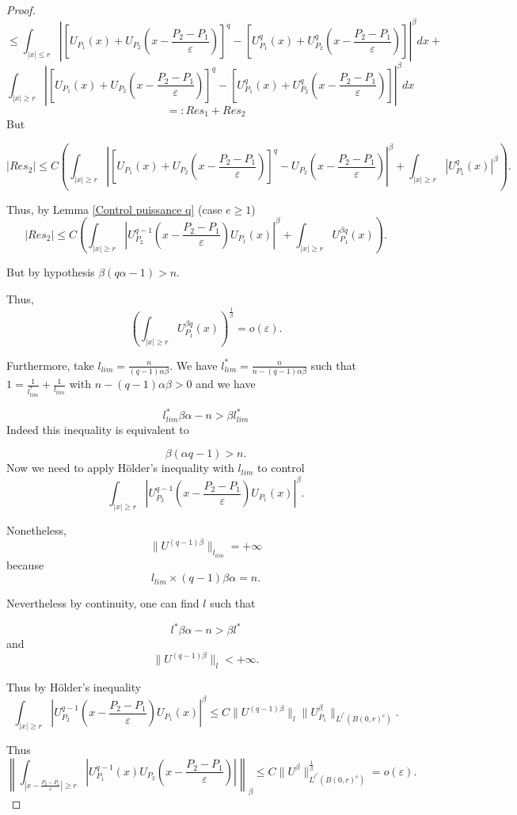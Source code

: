 \documentclass[12pt]{amsart}
\theoremstyle{plain}
\theoremstyle{definition}
\theoremstyle{remark}
\renewcommand{\epsilon}{\varepsilon}
\begin{document}
\begin{proof}
$$ \leq 
\int_{|x|\leq r} \left|\left[U_{P_1}(x)+U_{P_2}\left(x-\frac{P_2-P_1}{\epsilon}\right)\right]^q-\left[U^q_{P_1}(x)+U_{P_2}^q\left(x-\frac{P_2-P_1}{\epsilon}\right)\right]\right|^\beta dx+$$ $$\int_{|x|\geq r} \left|\left[U_{P_1}(x)+U_{P_2}\left(x-\frac{P_2-P_1}{\epsilon}\right)\right]^q-\left[U^q_{P_1}(x)+U_{P_2}^q\left(x-\frac{P_2-P_1}{\epsilon}\right)\right]\right|^\beta dx$$
$$=: Res_1 + Res_2$$
But

$$|Res_2| \leq C\left(\int_{|x |\geq r}\left|\left[U_{P_1}(x)+U_{P_2}\left(x-\frac{P_2-P_1}{\epsilon}\right)\right]^q-U_{P_2}\left(x-\frac{P_2-P_1}{\epsilon}\right)\right|^\beta  + \int_{|x|\geq r}|U_{P_1}^q(x)|^\beta \right).$$

Thus, by Lemma \ref{Control puissance q} (case $e \geq 1$)
$$|Res_2| \leq C\left(\int_{|x|\geq r}\left|U_{P_2}^{q-1}\left(x-\frac{P_2-P_1}{\epsilon}\right)U_{P_1}(x)\right|^\beta + \int_{|x|\geq r}U_{P_1}^{\beta q}(x)\right).$$



    

But by hypothesis $\beta(q\alpha-1)>n$.


Thus,
$$\left(\int_{|x|\geq r}U_{P_1}^{\beta q}(x)\right)^{\frac{1}{\beta}} =o(\epsilon).$$


Furthermore,
take $l_{lim}=\frac{n}{(q-1)\alpha\beta}$.
We have $l_{lim}^*=\frac{n}{n-(q-1)\alpha \beta}$ such that $1= \frac{1}{l^*_{lim}}+\frac{1}{l_{lim}}$ with $n-(q-1)\alpha \beta>0$ and we have

$$l_{lim}^*\beta \alpha - n>\beta l_{lim}^*$$
Indeed this inequality is equivalent to

$$\beta(\alpha q-1) > n.$$
Now we need to apply Hölder's inequality with $l_{lim}$ to control 
$$\int_{|x|\geq r}\left|U_{P_2}^{q-1}\left(x-\frac{P_2-P_1}{\epsilon}\right)U_{P_1}(x)\right|^\beta.$$

 \noindent  Nonetheless, $$\|U^{(q-1)\beta}\|_{l_{lim}}=+ \infty$$
because
$$l_{lim} \times (q-1)\beta \alpha =n.$$


 \noindent  Nevertheless by continuity, one can find $l$ such that

$$l^*\beta\alpha-n > \beta l^*$$
and 
$$\|U^{(q-1)\beta}\|_{l}<+ \infty.$$

 \noindent  Thus by Hölder's inequality
$$\int_{|x|\geq r}\left|U_{P_2}^{q-1}\left(x-\frac{P_2-P_1}{\epsilon}\right)U_{P_1}(x)\right|^\beta \leq C\|U^{(q-1)\beta}\|_l\|U_{P_1}^\beta\|_{L^{l^*}(B(0,r)^c)}.$$

 \noindent  Thus 
$$\left\|\int_{|x - \frac{P_2-P_1}{\epsilon}|\geq r}\left|U_{P_1}^{q-1}(x)U_{P_2}\left(x-\frac{P_2-P_1}{\epsilon}\right)\right| \right\|_{\beta} \leq C\|U^\beta\|_{L^{l^*}(B(0,r)^c)}^{\frac{1}{\beta}}= o(\epsilon).$$


\end{proof}
\end{document}
